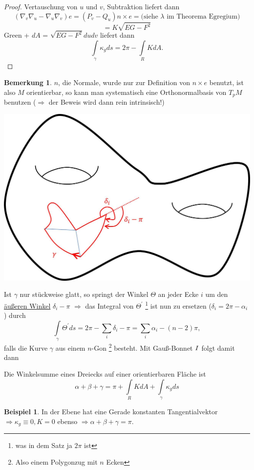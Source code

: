 \documentclass[a4paper,11pt,notitlepage]{report}
\theoremstyle{definition}
\newtheorem{remark}{Bemerkung}[chapter]
\newtheorem{example}{Beispiel}[chapter]
\newcommand{\RM}[1]{\MakeUppercase{\romannumeral #1{}}}
\begin{document}
\begin{proof}
	Vertauschung von $u$ und $v$, Subtraktion liefert dann
	$$(\nabla_v \nabla_u - \nabla_u \nabla_v) e = (P_v - Q_u) n \times e = \text{(siehe $\lambda$ im Theorema Egregium)}$$
	$$= K \sqrt{EG - F^2}$$
	Green + $dA$ = $\sqrt{EG - F^2} dudv$ liefert dann
	$$\int\limits_{\gamma}{\kappa_g ds} = 2 \pi - \int\limits_{R}{K dA}.$$
\end{proof}

\begin{remark}
	$n$, die Normale, wurde nur zur Definition von \underline{$n \times e$} benutzt, ist also $M$ orientierbar, so kann man systematisch eine Orthonormalbasis von $T_pM$ benutzen ($\Rightarrow$ der Beweis wird dann rein intrinsisch!)
\end{remark}

\begin{center}
		\includegraphics[scale=0.3]{images/2012_02_02_Bild4.jpg}
	\end{center}
	Ist $\gamma$ nur stückweise glatt, so springt der Winkel $\Theta$ an jeder Ecke $i$ um den \underline{äußeren Winkel} $\delta_i - \pi$ $\Rightarrow$ das Integral von $\Theta^\prime$ \footnote{was in dem Satz ja $2\pi$ ist} ist nun zu ersetzen ($\delta_i = 2 \pi - \alpha_i$) durch
	$$\int\limits_{\gamma}{\Theta^\prime ds} = 2 \pi - \sum\limits_{i}{\delta_i - \pi} = \sum\limits_{i}{\alpha_i - (n-2) \pi},$$ falls die Kurve $\gamma$ aus einem $n$-Gon \footnote{Also einem Polygonzug mit $n$ Ecken} besteht. Mit Gauß-Bonnet $\RM{1}$ folgt damit dann
	
\begin{theorem}
	Die Winkelsumme eines Dreiecks auf einer orientierbaren Fläche ist 
	$$\alpha + \beta + \gamma = \pi + \int\limits_{R}{K dA} + \int\limits_{\gamma}{\kappa_g ds}$$
\end{theorem}

\begin{example}
	In der Ebene hat eine Gerade konstanten Tangentialvektor \newline
	$\Rightarrow \kappa_g \equiv 0, K = 0$ ebenso $\Rightarrow \alpha + \beta + \gamma = \pi$.
\end{example}
\end{document}
